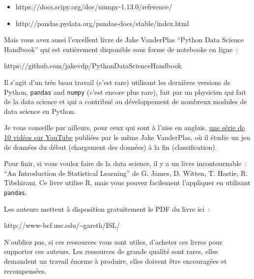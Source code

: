 \begin{itemize}
\tightlist
\item
  https://docs.scipy.org/doc/numpy-1.13.0/reference/
\item
  http://pandas.pydata.org/pandas-docs/stable/index.html
\end{itemize}

    Mais vous avez aussi l'excellent livre de Jake VanderPlas ``Python Data
Science Handbook'' qui est entièrement disponible sous forme de
notebooks en ligne~:

https://github.com/jakevdp/PythonDataScienceHandbook

Il s'agit d'un très beau travail (c'est rare) utilisant les dernières
versions de Python, \texttt{pandas} and \texttt{numpy} (c'est encore
plus rare), fait par un physicien qui fait de la data science et qui a
contribué au développement de nombreux modules de data science en
Python.

Je vous conseille par ailleurs, pour ceux qui sont à l'aise en anglais,
\href{https://www.youtube.com/watch?v=_ZEWDGpM-vM}{une série de 10
vidéos sur YouTube} publiées par le même Jake VanderPlas, où il étudie
un jeu de données du début (chargement des données) à la fin
(classification).

    Pour finir, si vous voulez faire de la data science, il y a un livre
incontournable~: ``An Introduction de Statistical Learning'' de G.
James, D. Witten, T. Hastie, R. Tibshirani. Ce livre utilise R, mais
vous pouvez facilement l'appliquer en utilisant \texttt{pandas}.

Les auteurs mettent à disposition gratuitement le PDF du livre ici~:

http://www-bcf.usc.edu/\textasciitilde{}gareth/ISL/

    N'oubliez pas, si ces ressources vous sont utiles, d'acheter ces livres
pour supporter ces auteurs. Les ressources de grande qualité sont rares,
elles demandent un travail énorme à produire, elles doivent être
encouragées et recompensées.


    
    
    
